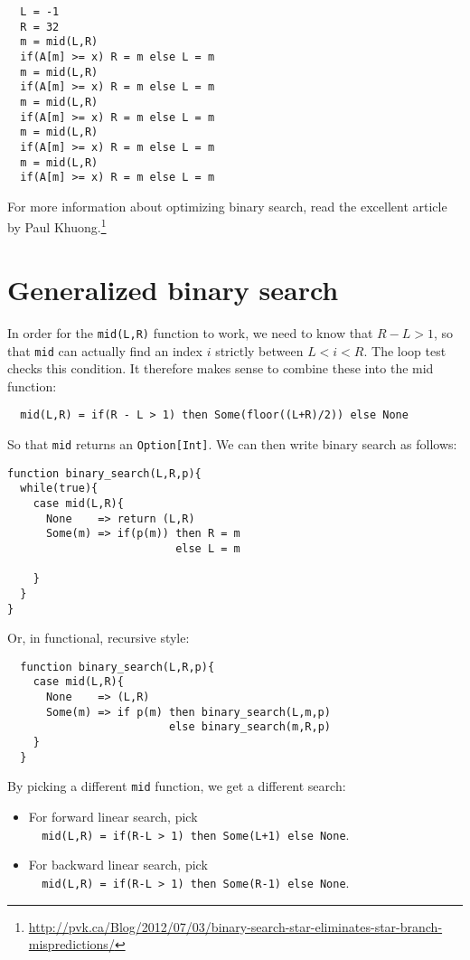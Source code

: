 \documentclass[a4paper, 11pt]{article}
\begin{document}
\begin{lstlisting}
  L = -1
  R = 32
  m = mid(L,R)
  if(A[m] >= x) R = m else L = m
  m = mid(L,R)
  if(A[m] >= x) R = m else L = m
  m = mid(L,R)
  if(A[m] >= x) R = m else L = m
  m = mid(L,R)
  if(A[m] >= x) R = m else L = m
  m = mid(L,R)
  if(A[m] >= x) R = m else L = m
\end{lstlisting}

\noindent For more information about optimizing binary search, read the excellent article by Paul Khuong.\footnote{\url{http://pvk.ca/Blog/2012/07/03/binary-search-star-eliminates-star-branch-mispredictions/}}

\section{Generalized binary search}

In order for the \lstinline|mid(L,R)| function to work, we need to know that $R-L>1$, so that \lstinline|mid| can actually find an index $i$ strictly between $L < i < R$. The loop test checks this condition. It therefore makes sense to combine these into the mid function:

\begin{lstlisting}
  mid(L,R) = if(R - L > 1) then Some(floor((L+R)/2)) else None
\end{lstlisting}

\noindent So that \lstinline|mid| returns an \lstinline|Option[Int]|. We can then write binary search as follows:

\begin{minipage}{\linewidth}
\begin{lstlisting}
function binary_search(L,R,p){
  while(true){
    case mid(L,R){
      None    => return (L,R)
      Some(m) => if(p(m)) then R = m
                          else L = m

    }
  }
}
\end{lstlisting}
\end{minipage}

\noindent Or, in functional, recursive style:

\begin{lstlisting}
  function binary_search(L,R,p){
    case mid(L,R){
      None    => (L,R)
      Some(m) => if p(m) then binary_search(L,m,p)
                         else binary_search(m,R,p)
    }
  }
\end{lstlisting}

\noindent By picking a different \lstinline|mid| function, we get a different search:
\begin{itemize}
  \item For forward linear search, pick \\ \lstinline|  mid(L,R) = if(R-L > 1) then Some(L+1) else None|.
  \item For backward linear search, pick \\ \lstinline|  mid(L,R) = if(R-L > 1) then Some(R-1) else None|.
\end{itemize}
\end{document}
